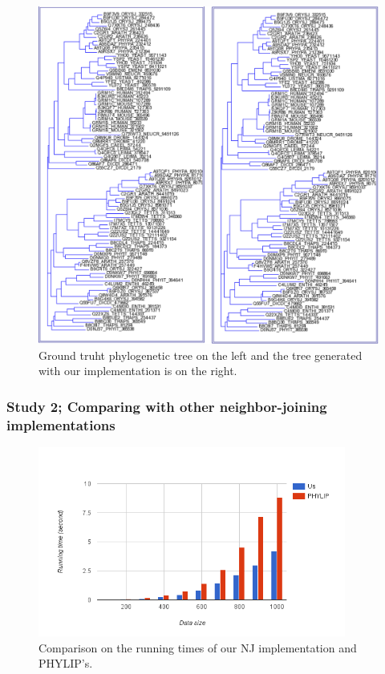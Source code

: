 \documentclass[11pt,letterpaper]{article}
\theoremstyle{definition}
\begin{document}
\begin{figure}[h!]
  \centering
  \includegraphics[width=\textwidth]{gt-kimura.jpg}
  \caption{Ground truht phylogenetic tree on the left and the tree generated with our implementation is on the right.}
  \label{fig:gt-kimura}
\end{figure}

\newpage
\subsubsection{Study 2; Comparing with other neighbor-joining implementations}

\begin{figure}[t]
  \centering
  \includegraphics[width=0.9\textwidth]{runningtime.png}
  \caption{Comparison on the running times of our NJ implementation and PHYLIP's.}
  \label{fig:runningtime}
\end{figure}
\end{document}
